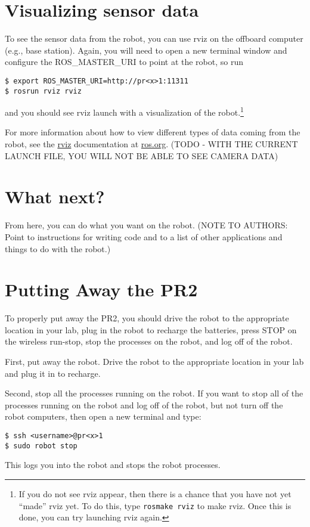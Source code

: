 \section{Visualizing sensor data}
To see the sensor data from the robot, you can use rviz on the offboard computer (e.g., base station).  Again, you will 
need to open a new terminal window and configure the ROS\_MASTER\_URI to point at the robot, so run
\begin{verbatim}
$ export ROS_MASTER_URI=http://pr<x>1:11311
$ rosrun rviz rviz
\end{verbatim}
and you should see rviz launch with a visualization of the robot.\footnote{If you do not see rviz appear, then there is a chance that you have not yet ``made'' rviz yet. To do this, type \texttt{rosmake rviz} to make rviz. Once this is done, you can try launching rviz again.}

For more information about how to view different types 
of data coming from the robot, see the \href{http://ros.org/wiki/rviz}{rviz} documentation at 
\href{http://www.ros.org}{ros.org}.
(TODO - WITH THE CURRENT LAUNCH FILE, YOU WILL NOT BE ABLE TO SEE CAMERA DATA)

\section{What next?}
From here, you can do what you want on the robot.  (NOTE TO AUTHORS: Point to instructions for writing code and to a list of other 
applications and things to do with the robot.)

\section{Putting Away the PR2}
To properly put away the PR2, you should drive the robot to the appropriate location in your lab, plug in the robot to recharge the batteries,
press STOP on the wireless run-stop, stop the processes on the robot, and log off of the robot.

First, put away the robot. Drive the robot to the appropriate location in your lab and plug it in to recharge.

Second, stop all the processes running on the robot. If you want to stop all of the processes running on the robot and log off of the robot, but not turn off the robot computers, then open a new terminal and type:
\begin{verbatim}
$ ssh <username>@pr<x>1
$ sudo robot stop
\end{verbatim}
This logs you into the robot and stops the robot processes.

